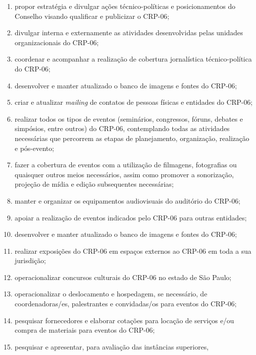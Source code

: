 \begin{enumerate}
        comunicação e diálogo com a categoria e a sociedade;
  \item
        propor estratégia e divulgar ações técnico-políticas e posicionamentos
        do Conselho visando qualificar e publicizar o CRP-06;
  \item
        divulgar interna e externamente as atividades desenvolvidas pelas
        unidades organizacionais do CRP-06;
  \item
        coordenar e acompanhar a realização de cobertura jornalística
        técnico-política do CRP-06;
  \item
        desenvolver e manter atualizado o banco de imagens e fontes do CRP-06;
  \item
        criar e atualizar \emph{mailing} de contatos de pessoas físicas e
        entidades do CRP-06;
  \item
        realizar todos os tipos de eventos (seminários, congressos, fóruns,
        debates e simpósios, entre outros) do CRP-06, contemplando todas as
        atividades necessárias que percorrem as etapas de planejamento,
        organização, realização e pós-evento;
  \item
        fazer a cobertura de eventos com a utilização de filmagens,
        fotografias ou quaisquer outros meios necessários, assim como promover
        a sonorização, projeção de mídia e edição subsequentes necessárias;
  \item
        manter e organizar os equipamentos audiovisuais do auditório do
        CRP-06;
  \item
        apoiar a realização de eventos indicados pelo CRP-06 para outras
        entidades;
  \item
        desenvolver e manter atualizado o banco de imagens e fontes do CRP-06;
  \item
        realizar exposições do CRP-06 em espaços externos ao CRP-06 em toda a
        sua jurisdição;
  \item
        operacionalizar concursos culturais do CRP-06 no estado de São Paulo;
  \item
        operacionalizar o deslocamento e hospedagem, se necessário, de
        coordenadoras/es, palestrantes e convidadas/os para eventos do CRP-06;
  \item
        pesquisar fornecedores e elaborar cotações para locação de serviços
        e/ou compra de materiais para eventos do CRP-06;
  \item
        pesquisar e apresentar, para avaliação das instâncias superiores,

\end{enumerate}
